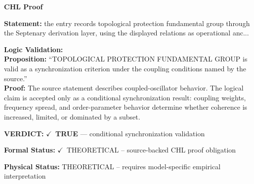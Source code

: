 \vspace{0.45em}
\noindent\textbf{CHL Proof}\par
\textbf{Statement:} the entry records topological protection fundamental group through the Septenary
derivation layer, using the displayed relations as operational anc...

\textbf{Logic Validation:}\\
\textbf{Proposition:} ``TOPOLOGICAL PROTECTION FUNDAMENTAL GROUP is valid as a synchronization criterion under
the coupling conditions named by the source.''\\
\textbf{Proof:} The source statement describes coupled-oscillator behavior. The logical claim is
accepted only as a conditional synchronization result: coupling weights, frequency
spread, and order-parameter behavior determine whether coherence is increased, limited,
or dominated by a subset.

\textbf{VERDICT:} \ensuremath{\checkmark}\ \textbf{TRUE} --- conditional synchronization validation

\textbf{Formal Status:} \ensuremath{\checkmark}\ THEORETICAL -- source-backed CHL proof obligation

\textbf{Physical Status:} THEORETICAL -- requires model-specific empirical interpretation
\par\vspace{0.45em}
\par
\ifTZPDarkEdition
{}
\fi
\endgroup
\endgroup
